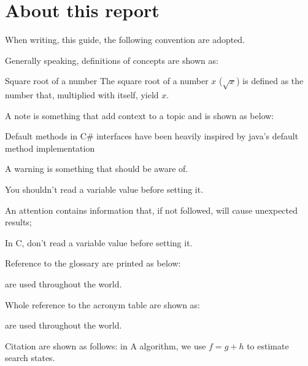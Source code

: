 \chapter{About this report}

When writing, this guide, the following convention are adopted.

Generally speaking, definitions of concepts are shown as:

\begin{definition}{Square root of a number}
    The square root of a number $x$ ($\sqrt{x}$) is defined as the number that, multiplied with itself, yield $x$.
\end{definition}

A note is something that add context to a topic and is shown as below:

\begin{info}
    Default methods in C\# interfaces have been heavily inspired by java's default method implementation
\end{info}

A warning is something that should be aware of.

\begin{warning}
    You shouldn't read a variable value before setting it.
\end{warning}

An attention contains information that, if not followed, will cause unexpected results;

\begin{attention}
    In C, don't read a variable value before setting it.
\end{attention}

Reference to the glossary are printed as below:

 are used throughout the world.

Whole reference to the acronym table are shown as:

 are used throughout the world.

Citation are shown as follows: in A\* algorithm, we use $f=g+h$ to estimate search states\cite{hart1968-astar}.